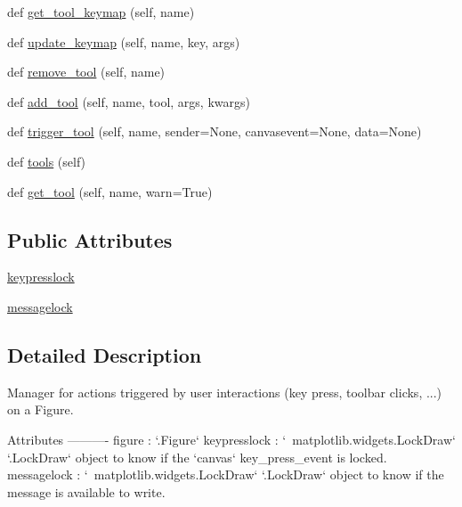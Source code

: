 \begin{DoxyCompactItemize}
def \hyperlink{classmatplotlib_1_1backend__managers_1_1ToolManager_a18680c9b74a62aae5569481a0bc6f00e}{get\+\_\+tool\+\_\+keymap} (self, name)
\item 
def \hyperlink{classmatplotlib_1_1backend__managers_1_1ToolManager_aff7f44850960745d2cead7d2ea7ede1d}{update\+\_\+keymap} (self, name, key, args)
\item 
def \hyperlink{classmatplotlib_1_1backend__managers_1_1ToolManager_a74762e8ff793ceca77b6b1b43ce84d3c}{remove\+\_\+tool} (self, name)
\item 
def \hyperlink{classmatplotlib_1_1backend__managers_1_1ToolManager_a03cca2a1e94b52ac37f53b0906aa3521}{add\+\_\+tool} (self, name, tool, args, kwargs)
\item 
def \hyperlink{classmatplotlib_1_1backend__managers_1_1ToolManager_aa251334d40971469f162ff354045ebbc}{trigger\+\_\+tool} (self, name, sender=None, canvasevent=None, data=None)
\item 
def \hyperlink{classmatplotlib_1_1backend__managers_1_1ToolManager_aed974b1d9d043a81f94565fa32e5eda2}{tools} (self)
\item 
def \hyperlink{classmatplotlib_1_1backend__managers_1_1ToolManager_ae5ddb2307368e7c3bbb10bc447104b2c}{get\+\_\+tool} (self, name, warn=True)
\end{DoxyCompactItemize}
\subsection*{Public Attributes}
\begin{DoxyCompactItemize}
\item 
\hyperlink{classmatplotlib_1_1backend__managers_1_1ToolManager_a43e924a83290e3c015b1cfabe6f28acb}{keypresslock}
\item 
\hyperlink{classmatplotlib_1_1backend__managers_1_1ToolManager_a43829822158e8ddbb92dc16f95a290e9}{messagelock}
\end{DoxyCompactItemize}


\subsection{Detailed Description}
\begin{DoxyVerb}Manager for actions triggered by user interactions (key press, toolbar
clicks, ...) on a Figure.

Attributes
----------
figure : `.Figure`
keypresslock : `~matplotlib.widgets.LockDraw`
    `.LockDraw` object to know if the `canvas` key_press_event is locked.
messagelock : `~matplotlib.widgets.LockDraw`
    `.LockDraw` object to know if the message is available to write.
\end{DoxyVerb}
 

